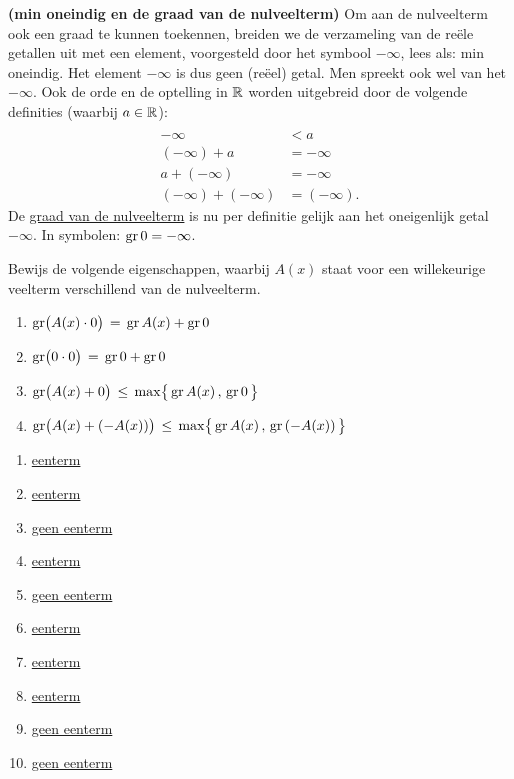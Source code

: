 \documentclass{ximera}
\begin{document}
\clearpage

\begin{Uitbreiding}
\begin{Oefening}%
\label{oefgraadnulveelterm}
{\bf (min oneindig en de graad van de nulveelterm)} 
Om aan de nulveelterm ook een graad te kunnen toekennen, breiden we de verzameling van de re\"ele getallen uit met een element, voorgesteld door het symbool $- \infty$, lees als: min oneindig. Het element $-\infty$ is dus geen (re\"eel) getal. Men spreekt ook wel van het  $-\infty$. Ook de orde en de optelling in $\mathbb{R}$ worden uitgebreid door de volgende definities (waarbij $a \in \mathbb{R}$):
\[
\begin{aligned}
\\[-0.5cm]
-\infty & < a \\
(-\infty) + a & = -\infty \\
a + (-\infty) & = -\infty \\
(-\infty) + (-\infty) & = (-\infty).
\end{aligned}
\]
De \underline{graad van de nulveelterm} is nu per definitie gelijk aan het oneigenlijk getal $-\infty$. In symbolen: $\operatorname{gr} 0 = - \infty$.

Bewijs de volgende eigenschappen, waarbij $A(x)$ staat voor een willekeurige veelterm verschillend van de nulveelterm.
\begin{enumerate}%
\item
$\operatorname{gr}\bigl( A(x) \cdot 0 \bigr) \, = \, \operatorname{gr} A(x) + \operatorname{gr} 0$
\item
$\operatorname{gr}\bigl( 0 \cdot 0 \bigr) \, = \, \operatorname{gr} 0 + \operatorname{gr} 0$
\item
$\displaystyle \operatorname{gr}\bigl( A(x) + 0 \bigr) \, \leq \, \max \bigl\{ \,\operatorname{gr} A(x)\, , \, \operatorname{gr} 0 \, \bigr\}$
\item
$\displaystyle \operatorname{gr}\bigl( A(x) + (-A(x)) \bigr) \, \leq \, \max \bigl\{ \,\operatorname{gr} A(x)\, , \, \operatorname{gr} \left(-A(x)\right) \, \bigr\}$
\end{enumerate}
\end{Oefening}
\end{Uitbreiding}


\begin{Antwoord} \label{antw1.1}
    \begin{enumerate}%
    \item
    \hyperlink{oef1.1}{eenterm}
    \item
    \hyperlink{oef1.1}{eenterm}
    \item
    \hyperlink{oef1.1}{geen eenterm}
    \item
    \hyperlink{oef1.1}{eenterm}
    \item
    \hyperlink{oef1.1}{geen eenterm}
    \item
    \hyperlink{oef1.1}{eenterm}
    \item\hyperlink{oef1.1}{eenterm}
    \item
    \hyperlink{oef1.1}{eenterm}
    \item
    \hyperlink{oef1.1}{geen eenterm}
    \item
    \hyperlink{oef1.1}{geen eenterm}
    \end{enumerate}
    \end{Antwoord}
    
\end{document}
